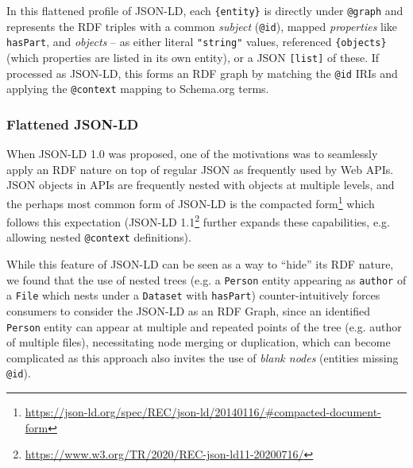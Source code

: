 \documentclass[ds,v1.1.2,openaccess]{iosart2x}%
\begin{document}
In this flattened profile of JSON-LD, each \texttt{\{entity\}} is directly
under \texttt{@graph} and represents the RDF triples with a common \textit{subject}
(\texttt{@id}), mapped \textit{properties} like \texttt{hasPart}, and \textit{objects} -- as
either literal \texttt{"string"} values, referenced \texttt{\{objects\}} (which
properties are listed in its own entity), or a JSON \texttt{[list]} of these.
If processed as JSON-LD, this forms an RDF graph by matching the \texttt{@id}
IRIs and applying the \texttt{@context} mapping to Schema.org terms.
\normalsize

 \subsubsection{Flattened JSON-LD}

When JSON-LD 1.0 \cite{sporny_2014} was proposed, one of the motivations
was to seamlessly apply an RDF nature on top of regular JSON as
frequently used by Web APIs. JSON objects in APIs are frequently nested
with objects at multiple levels, and the perhaps most common form of
JSON-LD is the compacted
form\footnote{\url{https://json-ld.org/spec/REC/json-ld/20140116/\#compacted-document-form}}
which follows this expectation (JSON-LD
1.1\footnote{\url{https://www.w3.org/TR/2020/REC-json-ld11-20200716/}} further
expands these capabilities, e.g. allowing nested \texttt{@context} definitions).

While this feature of JSON-LD can be seen as a way to ``hide'' its RDF
nature, we found that the use of nested trees (e.g. a \texttt{Person} entity
appearing as \texttt{author} of a \texttt{File} which nests under a \texttt{Dataset} with
\texttt{hasPart}) counter-intuitively forces consumers to consider the JSON-LD
as an RDF Graph, since an identified \texttt{Person} entity can appear at
multiple and repeated points of the tree (e.g. author of multiple
files), necessitating node merging or duplication, which can become
complicated as this approach also invites the use of \textit{blank nodes}
(entities missing \texttt{@id}).
\end{document}
